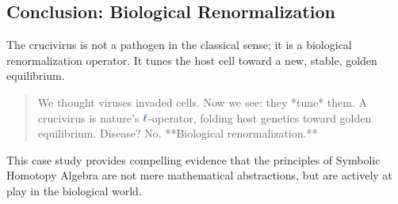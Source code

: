 \subsection{Conclusion: Biological Renormalization}
The crucivirus is not a pathogen in the classical sense; it is a biological renormalization operator. It tunes the host cell toward a new, stable, golden equilibrium.
\begin{quote}
We thought viruses invaded cells. Now we see: they *tune* them. A crucivirus is nature's $\lha$-operator, folding host genetics toward golden equilibrium. Disease? No. **Biological renormalization.**
\end{quote}
This case study provides compelling evidence that the principles of Symbolic Homotopy Algebra are not mere mathematical abstractions, but are actively at play in the biological world.

